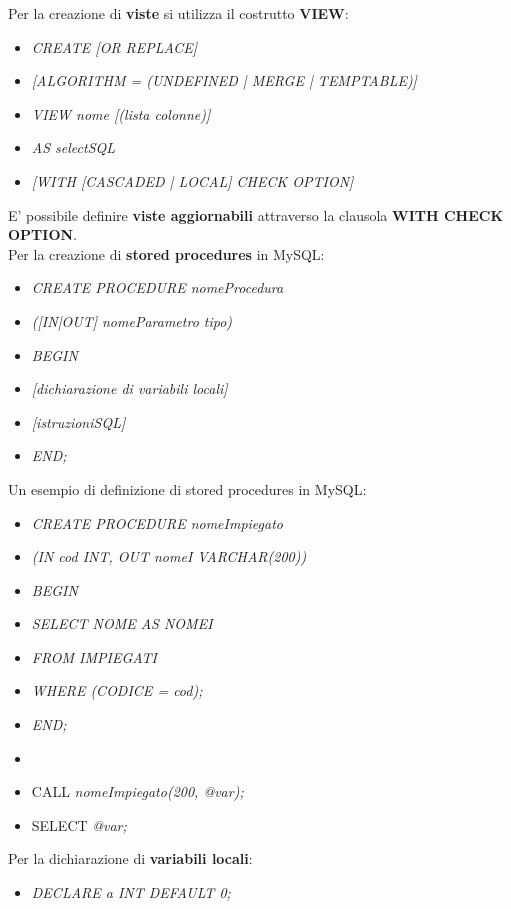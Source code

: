 \documentclass{article}
\begin{document}
Per la creazione di \textbf{viste} si utilizza il costrutto \textbf{VIEW}:
\begin{itemize}[label={ }, leftmargin=1cm]
    \item \textit{CREATE [OR REPLACE]}
    \item \textit{[ALGORITHM = (UNDEFINED | MERGE | TEMPTABLE)]}
    \item \textit{VIEW nome [(lista colonne)]}
    \item \textit{AS selectSQL}
    \item \textit{[WITH [CASCADED | LOCAL] CHECK OPTION]}
\end{itemize}
E' possibile definire \textbf{viste aggiornabili} attraverso la clausola \textbf{WITH CHECK OPTION}.\vspace{14pt}\\
Per la creazione di \textbf{stored procedures} in MySQL:
\begin{itemize}[label={ }, leftmargin=1cm]
    \item \textit{CREATE PROCEDURE nomeProcedura}
    \item \textit{([IN|OUT] nomeParametro tipo)}
    \item \textit{BEGIN}
    \item \textit{[dichiarazione di variabili locali]}
    \item \textit{[istruzioniSQL]}
    \item \textit{END;}
\end{itemize}
Un esempio di definizione di stored procedures in MySQL:
\begin{itemize}[label={ }, leftmargin=1cm]
    \item \textit{CREATE PROCEDURE nomeImpiegato}
    \item \textit{(IN cod INT, OUT nomeI VARCHAR(200))}
    \item \textit{BEGIN}
    \item \textit{SELECT NOME AS NOMEI}
    \item \textit{FROM IMPIEGATI}
    \item \textit{WHERE (CODICE = cod);}
    \item \textit{END;}
    \item 
    \item \quad CALL \textit{nomeImpiegato(200, @var);}
    \item \quad SELECT \textit{@var;}\\
\end{itemize}
Per la dichiarazione di \textbf{variabili locali}:
\begin{itemize}[label={ }, leftmargin=1cm]
    \item \textit{DECLARE a INT DEFAULT 0;}\\
\end{itemize}
\end{document}

